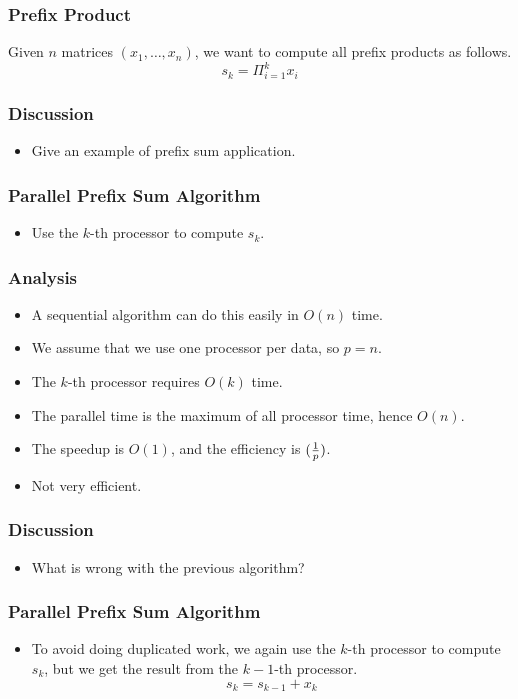 \documentclass{beamer}
\begin{document}
\begin{CJK}{UTF8}{bsmi}
\begin{frame}
\frametitle{Prefix Product} Given $n$ matrices $(x_1, \ldots, x_n)$, we
want to compute all prefix products as follows.
\begin{equation}
s_k = \Pi_{i = 1}^k x_i
\end{equation}
\end{frame}

\begin{frame}
\frametitle{Discussion}
\begin{itemize}
\item Give an example of prefix sum application.
\end{itemize}
\end{frame}

\begin{frame}
\frametitle{Parallel Prefix Sum Algorithm}
\begin{itemize}
\item Use the $k$-th processor to compute $s_k$.
\end{itemize}
\end{frame}


\begin{frame}
\frametitle{Analysis}
\begin{itemize}
\item A sequential algorithm can do this easily in $O(n)$ time.
\item We assume that we use one processor per data, so $p = n$.
\item The $k$-th processor requires $O(k)$ time.
\item The parallel time is the maximum of all processor time, hence
  $O(n)$.
\item The speedup is $O(1)$, and the efficiency is $({1 \over p})$. 
\item Not very efficient.
\end{itemize}
\end{frame}

\begin{frame}
\frametitle{Discussion}
\begin{itemize}
\item What is wrong with the previous algorithm?
\end{itemize}
\end{frame}

\begin{frame}
\frametitle{Parallel Prefix Sum Algorithm}
\begin{itemize}
\item To avoid doing duplicated work, we again use the $k$-th processor
  to compute $s_k$, but we get the result from the $k-1$-th processor.
\begin{equation}
s_k = s_{k-1} + x_k
\end{equation}
\end{itemize}
\end{frame}


\end{CJK}
\end{document}
